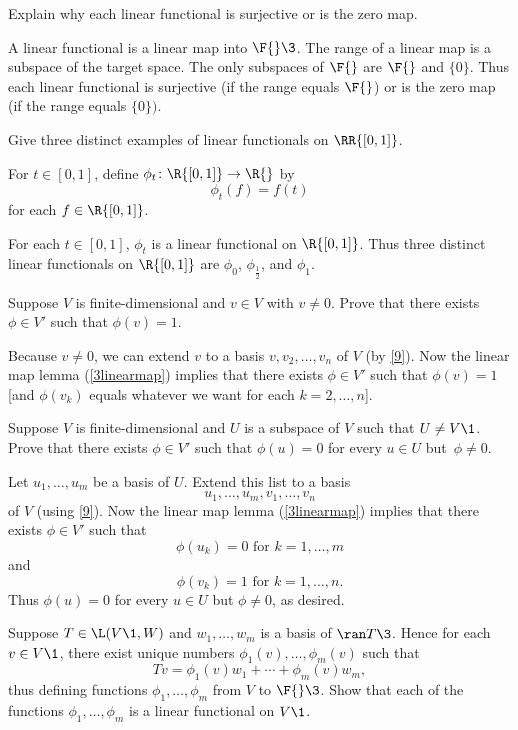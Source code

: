 
\exercise
Explain why each linear functional is surjective or is the zero map.

\begin{Solution}
A linear functional is a linear map into $\F{}\3$. The range of a linear map is a subspace of the target space. The only subspaces of $\F{}$ are $\F{}$ and $\{0\}$. Thus each linear functional is surjective (if the range equals $\F{}$) or is the zero map (if the range equals $\{0\})$.
\end{Solution}

\exercise
Give three distinct examples of linear functionals on $\RR{[0,1]}$.

\begin{Solution}
For $t \in [0, 1]$, define $\phi_t \colon \R{[0,1]} \to \R{}$ by
\[
\phi_t(f) = f(t)
\]
for each $f \in \R{[0,1]}$.

For each $t \in [0, 1]$, $\phi_t$ is a linear functional on $\R{[0,1]}$. Thus three distinct linear functionals on $\R{[0,1]}$ are $\phi_0$, $\phi_{\frac{1}{2}}$, and $\phi_1$.
\end{Solution}

\exercise
Suppose $V$ is finite-dimensional and $v \in V$ with $v \ne 0$. Prove that there exists $\phi \in V'$ such that $\phi(v) = 1$. \label{HB1}

\begin{Solution}
Because $v \ne 0$, we can extend $v$ to a basis $v, v_2, \dots, v_n$ of $V$ (by \ref{9}). Now the linear map lemma (\ref{3linearmap}) implies that there exists $\phi \in V'$ such that $\phi(v) = 1$ [and $\phi(v_k)$ equals whatever we want for each $k = 2, \dots, n$].
\end{Solution}

\exercise  \label{4321}
Suppose $V$ is finite-dimensional and $U$ is a subspace of $V$ such that $U \ne V\1$. Prove that there exists $\phi \in V'$ such that $\phi(u) = 0$ for every $u \in U$ but~$\phi \ne 0$.

\begin{Solution}
Let $u_1, \dots, u_m$ be a basis of $U$. Extend this list to a basis
\[
u_1, \dots, u_m, v_1, \dots, v_n
\]
of $V$ (using \ref{9}). Now the linear map lemma (\ref{3linearmap}) implies that there exists $\phi \in V'$ such that
\[
\phi(u_k) = 0 \text{\ for\ } k = 1,\dots, m
\]
and
\[
\phi(v_k) = 1 \text{\ for\ } k = 1, \dots,n.
\]
Thus $\phi(u) = 0$ for every $u \in U$ but $\phi \ne 0$, as desired.
\end{Solution}

\exercise
Suppose $T \in \L(V\1, W)$ and $w_1, \ldots, w_m$ is a basis of $\ran T\3$. Hence for each $v \in V\1$, there exist unique numbers
$\phi_1(v), \ldots, \phi_m(v)$ such that
\[
Tv = \phi_1(v) w_1 + \cdots + \phi_m(v) w_m,
\]
thus defining functions $\phi_1, \ldots, \phi_m$ from $V$ to $\F{}\3$.
Show that each of the functions $\phi_1, \ldots, \phi_m$ is a linear functional on $V\1$.

